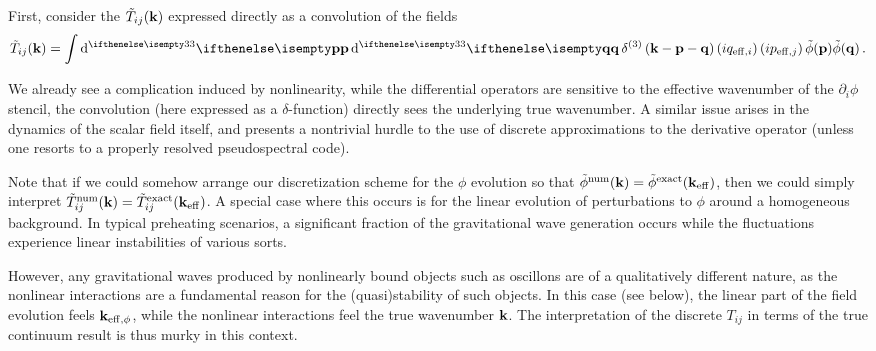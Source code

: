 \documentclass{revtex4}
\begin{document}
First, consider the $\tilde{T}_{ij}({\bf k})$ expressed directly as a convolution of the fields
\begin{equation}
  \tilde{T}_{ij}(\kvec) = \int \ud[3]{\myvec{p}}\ud[3]{\myvec{q}} \delta^{\rm (3)}\left(\kvec - \myvec{p}-\myvec{q}\right)\left(iq_{{\rm eff},i}\right)\left(ip_{{\rm eff},j}\right)\tilde{\phi}(\myvec{p})\tilde{\phi}(\myvec{q}) \, .
\end{equation}

We already see a complication induced by nonlinearity, while the differential operators are sensitive to the effective wavenumber of the $\partial_i\phi$ stencil, the convolution (here expressed as a $\delta$-function) directly sees the underlying true wavenumber.
A similar issue arises in the dynamics of the scalar field itself, and presents a nontrivial hurdle to the use of discrete approximations to the derivative operator (unless one resorts to a properly resolved pseudospectral code).

Note that if we could somehow arrange our discretization scheme for the $\phi$ evolution so that $\tilde{\phi}^{\rm num}({\bf k}) = \tilde{\phi}^{\rm exact}({\bf k}_{\rm eff})$,
then we could simply interpret $\tilde{T}_{ij}^{\rm num}({\bf k}) = \tilde{T}_{ij}^{\rm exact}({\bf k}_{\rm eff})$.
A special case where this occurs is for the linear evolution of perturbations to $\phi$ around a homogeneous background.
In typical preheating scenarios, a significant fraction of the gravitational wave generation occurs while the fluctuations experience linear instabilities of various sorts.

However, any gravitational waves produced by nonlinearly bound objects such as oscillons are of a qualitatively different nature, as the nonlinear interactions are a fundamental reason for the (quasi)stability of such objects.
In this case (see below), the linear part of the field evolution feels ${\bf k}_{{\rm eff},\phi}$, while the nonlinear interactions feel the true wavenumber ${\bf k}$.
The interpretation of the discrete $T_{ij}$ in terms of the true continuum result is thus murky in this context.
\end{document}
